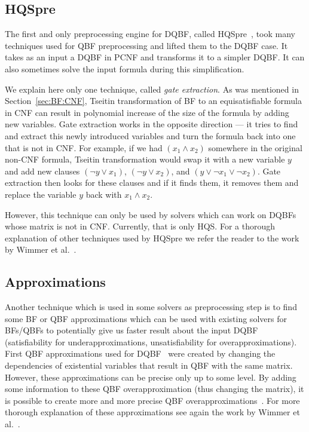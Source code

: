 \documentclass[
  digital, %
  color,
  twoside, %
  table,   %
  nolof,     %
  nolot,     %
]{fithesis3}
\theoremstyle{definition}
\theoremstyle{remark}
\begin{document}
\subsection{HQSpre}
\label{sec:HQSpre}
The first and only preprocessing engine for DQBF, called HQSpre~\cite{HQSpre1,HQSpre2,HQSpreJournal}, took many techniques used for QBF preprocessing and lifted them to the DQBF case. It takes as an input a DQBF in PCNF and transforms it to a simpler DQBF. It can also sometimes solve the input formula during this simplification. 

We explain here only one technique, called \emph{gate extraction}. As was mentioned in Section~\ref{sec:BF:CNF}, Tseitin transformation of BF to an equisatisfiable formula in CNF can result in polynomial increase of the size of the formula by adding new variables. Gate extraction works in the opposite direction --- it tries to find and extract this newly introduced variables and turn the formula back into one that is not in CNF. %
For example, if we had $(x_1 \land x_2)$ somewhere in the original non-CNF formula, Tseitin transformation would swap it with a new variable $y$ and add new clauses $(\neg y \lor x_1)$, $(\neg y \lor x_2)$, and $(y \lor \neg x_1 \lor \neg x_2)$. Gate extraction then looks for these clauses and if it finds them, it removes them and replace the variable $y$ back with $x_1 \land x_2$.

However, this technique can only be used by solvers which can work on DQBFs whose matrix is not in CNF. Currently, that is only HQS. For a thorough explanation of other techniques used by HQSpre we refer the reader to the work by Wimmer et al.~\cite{HQSpreJournal}. 

\subsection{Approximations}
\label{sec:prepro:approximations}
Another technique which is used in some solvers as preprocessing step is to find some BF or QBF approximations which can be used with existing solvers for BFs/QBFs to potentially give us faster result about the input DQBF (satisfiability for underapproximations, unsatisfiability for overapproximations). First QBF approximations used for DQBF~\cite{HQSsimpleAlg} were created by changing the dependencies of existential variables that result in QBF with the same matrix. However, these approximations can be precise only up to some level. By adding some information to these QBF overapproximation (thus changing the matrix), it is possible to create more and more precise QBF overapproximations~\cite{FastDQBFRefutation}. For more thorough explanation of these approximations see again the work by Wimmer et al.~\cite[Section~3]{HQSpreJournal}.
\end{document}
